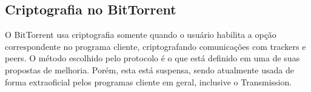 
\subsection*{Criptografia no BitTorrent}

O BitTorrent usa criptografia somente quando o usuário habilita a opção correspondente
no programa cliente, criptografando comunicações com \glspl*{tracker} e \glspl*{peer}.
O método escolhido pelo protocolo é o que está definido em uma de suas propostas de
melhoria. Porém, esta está suspensa, sendo atualmente usada de forma extraoficial
pelos programas cliente em geral, inclusive o Transmission.



